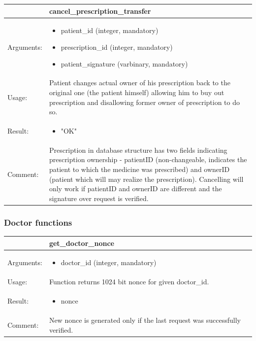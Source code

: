     \begin{longtable}{| p{6cm} | p{7.75cm} |}
    \hline
     & cancel\_prescription\_transfer \\ \hline
    Arguments: &  \begin{itemize}
    	\item patient\_id (integer, mandatory)
		\item prescription\_id (integer, mandatory)
		\item patient\_signature (varbinary, mandatory)
	\end{itemize}     \\ \hline
    Usage: & Patient changes actual owner of his prescription back to the original one (the patient himself) allowing him to buy out prescription and disallowing former owner of prescription to do so. \\ \hline
    Result: & \begin{itemize}
    	\item "OK"
	\end{itemize}     \\ \hline	
		Comment: & Prescription in database structure has two fields indicating prescription ownership - patientID (non-changeable, indicates the patient to which the medicine was prescribed) and ownerID (patient which will may realize the prescription). Cancelling will only work if patientID and ownerID are different and the signature over request is verified. \\ \hline
    \end{longtable}

\subsubsection{Doctor functions}


    \begin{longtable}{| p{6cm} | p{7.75cm} |}
    \hline
     & get\_doctor\_nonce \\ \hline
    Arguments: &  \begin{itemize}
    	\item doctor\_id (integer, mandatory)
	\end{itemize}     \\ \hline
    Usage: & Function returns 1024 bit nonce for given doctor\_id. \\ \hline
    Result: & \begin{itemize}
    	\item nonce
	\end{itemize}     \\ \hline	
			Comment: & New nonce is generated only if the last request was successfully verified.\\ \hline
    \end{longtable}


